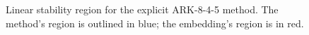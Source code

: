 \documentclass[letterpaper,10pt,english]{sphinxmanual}
\begin{document}
\begin{figure}[htbp]
\caption{Linear stability region for the explicit ARK-8-4-5 method.  The method's
region is outlined in blue; the embedding's region is in red.}\end{figure}
\end{document}
